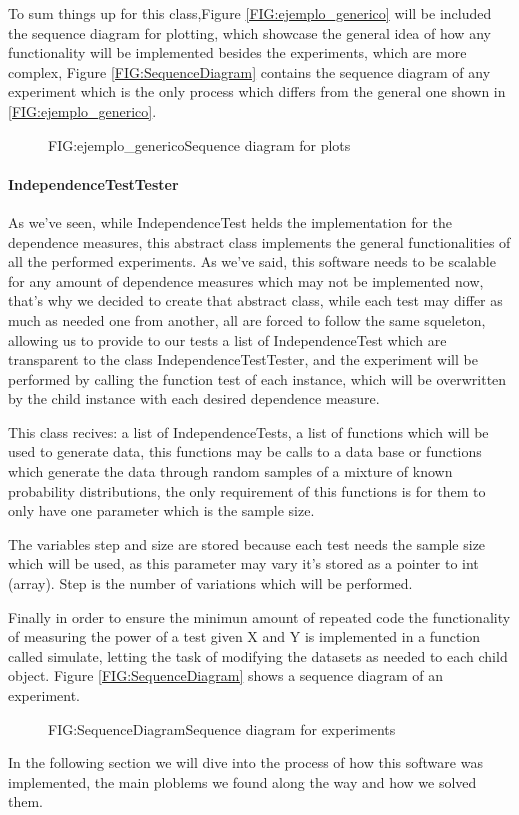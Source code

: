To sum things up for this class,Figure \ref{FIG:ejemplo_generico} will be included the sequence diagram for plotting, which showcase the general idea of how any functionality will be implemented besides the experiments, which are more complex, Figure \ref{FIG:SequenceDiagram} contains the sequence diagram of any experiment which is the only process which differs from the general one shown in \ref{FIG:ejemplo_generico}.

\begin{figure}[Sequence diagram of plotting]{FIG:ejemplo_generico}{Sequence diagram for plots}
\end{figure}


\paragraph{IndependenceTestTester}

As we've seen, while IndependenceTest helds the implementation for the dependence measures, this abstract class implements the general functionalities of all the performed experiments.
As we've said, this software needs to be scalable for any amount of dependence measures which may not be implemented now, that's why we decided to create that abstract class, while each test may differ as much as needed one from another, all are forced to follow the same squeleton, allowing us to provide to our tests a list of IndependenceTest which are transparent to the class IndependenceTestTester, and the experiment will be performed by calling the function test of each instance, which will be overwritten by the child instance with each desired dependence measure.

This class recives: a list of IndependenceTests, a list of functions which will be used to generate data, this functions may be calls to a data base or functions which generate the data through random samples of a mixture of known probability distributions, the only requirement of this functions is for them to only have one parameter which is the sample size.

The variables step and size are stored because each test needs the sample size which will be used, as this parameter may vary it's stored as a pointer to int (array). Step is the number of variations which will be performed.

Finally in order to ensure the minimun amount of repeated code the functionality of measuring the power of a test given X and Y is implemented in a function called simulate, letting the task of modifying the datasets as needed to each child object. Figure \ref{FIG:SequenceDiagram} shows a sequence diagram of an experiment.

\begin{figure}[Sequence diagram of an experiment]{FIG:SequenceDiagram}{Sequence diagram for experiments}
\end{figure}

In the following section we will dive into the process of how this software was implemented, the main ploblems we found along the way and how we solved them.
